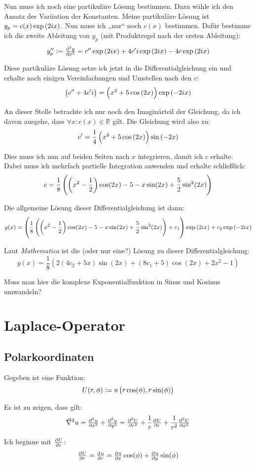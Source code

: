 \documentclass[11pt, ngerman]{article}
\newcommand{\laplace}{\vnabla^2}
\newcommand{\vnabla}{\vec \nabla}
\begin{document}
Nun muss ich noch eine partikuläre Lösung bestimmen. Dazu wähle ich den Ansatz
der Variiation der Konstanten. Meine partikuläre Lösung ist $y_p = c(x) \ex$.
Nun muss ich „nur“ noch $c(x)$ bestimmen. Dafür bestimme ich die zweite
Ableitung von $y_p$ (mit Produktregel nach der ersten Ableitung):
\[
	y_p'' := \od[2] yx = c'' \ex + 4 c'i \ex - 4 c \ex
\]

Diese partikuläre Lösung setze ich jetzt in die Differentialgleichung ein und
erhalte nach einigen Vereinfachungen und Umstellen nach den $c$:
\[
	\del{c'' + 4c'i} = \del{x^2 + 5 \cos\del{2x}} \exp\del{-2ix}
\]

An dieser Stelle betrachte ich nur noch den Imaginärteil der Gleichung, da ich
davon ausgehe, dass $\forall x \colon c(x) \in \mathbb R$ gilt. Die Gleichung
wird also zu:
\[
	c' = \frac14 \del{x^2 + 5 \cos\del{2x}} \sin\del{-2x}
\]

Dies muss ich nun auf beiden Seiten nach $x$ integrieren, damit ich $c$
erhalte. Dabei muss ich mehrfach partielle Integration anwenden und erhalte
schließlich:
\[
	c = \frac 18 \del{\del{x^2 - \frac 12} \cos(2x) - 5 - x \sin(2x) + \frac 52
	\sin^2(2x)}
\]

Die allgemeine Lösung dieser Differentialgleichung ist dann:
\[
	y(x) = \del{\frac 18 \del{\del{x^2 - \frac 12} \cos(2x) - 5 - x \sin(2x) +
	\frac 52 \sin^2(2x)} + c_1} \ex + c_2 \exp\del{-2ix}
\]

Laut \textit{Mathematica} ist die (oder nur eine?) Lösung zu dieser
Differentialgleichung:
\[
	y(x) = \frac{1}{8} \left(2 \left(4 c_2+5 x\right) \sin (2 x)+\left(8
	c_1+5\right) \cos (2 x)+2 x^2-1\right)
\]

Muss man hier die komplexe Exponentialfunktion in Sinus und Kosinus umwandeln?

\section{Laplace-Operator}

\subsection{Polarkoordinaten}

Gegeben ist eine Funktion:
\[
	U(r, \phi) := u\del{r \cos(\phi), r \sin(\phi)}
\]

Es ist zu zeigen, dass gilt:
\[
	\laplace u = \pd[2] ux + \pd[2] uy = \pd[2] Ur + \frac 1r \pd Ur + \frac
	1{r^2} \pd[2] U\phi
\]

Ich beginne mit $\pd U r$:
\[
	\pd Ur = \od ur = \pd ux \cos(\phi) + \pd uy \sin(\phi)
\]
\end{document}
